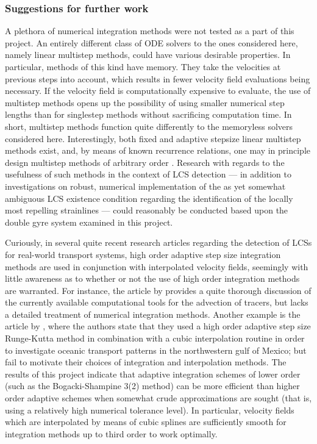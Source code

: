 \subsubsection{Suggestions for further work}

A plethora of numerical integration methods were not tested as a part of this
project. An entirely different class of ODE solvers to the ones considered here,
namely linear multistep methods, could have various desirable properties. In
particular, methods of this kind have memory. They take the velocities at
previous steps into account, which results in fewer velocity field evaluations
being necessary. If the velocity field is computationally expensive to evaluate,
the use of multistep methods opens up the possibility of using smaller numerical
step lengths than for singlestep methods without sacrificing computation time.
In short, multistep methods function quite differently to the memoryless
solvers considered here. Interestingly, both fixed and adaptive stepsize linear
multistep methods exist, and, by means of known recurrence relations, one may in
principle design multistep methods of arbitrary order
\parencite[chapter III]{hairer1993solving}. Research with regards to the
usefulness of such methods in the context of LCS detection --- in addition to
investigations on robust, numerical implementation of the as yet somewhat
ambiguous LCS existence condition regarding the identification of the locally
most repelling strainlines --- could reasonably be conducted based upon
the double gyre system examined in this project.

Curiously, in several quite recent research articles regarding the detection
of LCSs for real-world transport systems, high order adaptive step size
integration methods are used in conjunction with interpolated velocity fields,
seemingly with little awareness as to whether or not the use of high order
integration methods are warranted. For instance, the article by
\textcite{vansebille2018lagrangian} provides a quite thorough discussion of the
currently available computational tools for the advection of tracers, but lacks
a detailed treatment of numerical integration methods. Another example is
the article by \textcite{gough2017persistent}, where the authors state that they
used a high order adaptive step size Runge-Kutta method in combination with
a cubic interpolation routine in order to investigate oceanic transport
patterns in the northwestern gulf of Mexico; but fail to motivate their choices
of integration and interpolation methods. The results of this project indicate
that adaptive integration schemes of lower order (such as the Bogacki-Shampine
3(2) method) can be more efficient than higher order adaptive schemes when
somewhat crude approximations are sought (that is, using a relatively high
numerical tolerance level). In particular, velocity fields which are
interpolated by means of cubic splines are sufficiently smooth for integration
methods up to third order to work optimally.


